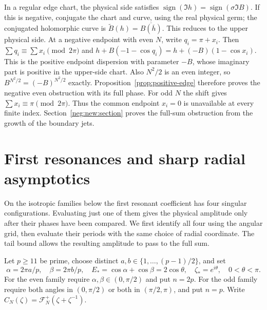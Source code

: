 \documentclass[11pt]{article}
\numberwithin{equation}{section}
\theoremstyle{definition}
\begin{document}
In a regular edge chart, the physical side satisfies
$\operatorname{sign}(\Im h)=\operatorname{sign}(\sigma\Im B)$.
If this is negative, conjugate the chart and curve, using the real
physical germ; the conjugated holomorphic curve is
$\widetilde B(h)=\overline{B(\overline h)}$. This reduces to the
upper physical side.
At a negative endpoint with even $N$, write $q_i=\pi+x_i$.
Then $\sum q_i\equiv\sum x_i\pmod{2\pi}$ and
$h+B(-1-\cos q_i)=h+(-B)(1-\cos x_i)$. This is the positive
endpoint dispersion with parameter $-B$, whose imaginary part is
positive in the upper-side chart. Also $N^2/2$ is an even integer, so
$B^{N^2/2}=(-B)^{N^2/2}$ exactly. Proposition~\ref{prop:positive-edge}
therefore proves the negative even obstruction with its full phase.
For odd $N$ the shift gives $\sum x_i\equiv\pi\pmod{2\pi}$.
Thus the common endpoint $x_i=0$ is unavailable at every finite index.
Section~\ref{neg:new:section} proves the full-sum obstruction from the
growth of the boundary jets.


\section{First resonances and sharp radial asymptotics}
\label{iso:new:radial:section}

On the isotropic families below the first resonant coefficient has
four singular configurations. Evaluating just one of them gives the
physical amplitude only after their phases have been compared. We
first identify all four using the angular grid, then evaluate their
periods with the same choice of radial coordinate. The tail bound
allows the resulting amplitude to pass to the full sum.

Let $p\ge11$ be prime, choose distinct
$a,b\in\{1,\ldots,(p-1)/2\}$, and set
\[
 \alpha=2\pi a/p,\quad\beta=2\pi b/p,\quad
 E_*=\cos\alpha+\cos\beta=2\cos\theta,\quad
                            \zeta_*=e^{i\theta},\quad0<\theta<\pi.
\]
For the even family require $\alpha,\beta\in(0,\pi/2)$ and
put $n=2p$.  For the odd family require both angles in
$(0,\pi/2)$ or both in $(\pi/2,\pi)$, and put $n=p$.
Write $C_N(\zeta)=\mathcal F_N^+(\zeta+\zeta^{-1})$.
\end{document}
